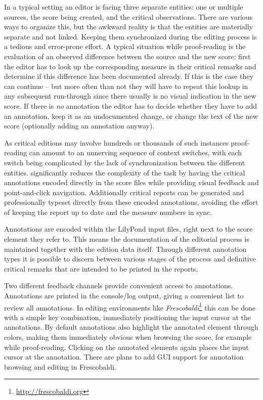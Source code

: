 \documentclass[]{ollmanual}
\begin{document}
In a typical setting an editor is facing three separate entities: one or
multiple sources, the score being created, and the critical
observations. There are various ways to organize this, but the awkward
reality is that the entities are materially separate and not linked.
Keeping them synchronized during the editing process is a tedious and
error-prone effort. A typical situation while proof-reading is the
evaluation of an observed difference between the source and the new
score: first the editor has to look up the corresponding measure in
their critical remarks and determine if this difference has been
documented already. If this is the case they can continue -- but more
often than not they will have to repeat this lookup in any subsequent
run-through since there usually is no visual indication in the new
score. If there is \emph{no} annotation the editor has to decide whether
they have to add an annotation, keep it as an undocumented change, or
change the text of the new score (optionally adding an annotation
anyway).

As critical editions may involve hundreds or thousands of such instances
proof-reading can amount to an unnerving sequence of context switches,
with each switch being complicated by the lack of synchronization
between the different entities. 
significantly reduces the complexity of the task by having the critical
annotations encoded directly in the score files while providing visual
feedback and point-and-click navigation. Additionally critical reports
can be generated and professionally typeset directly from these encoded
annotations, avoiding the effort of keeping the report up to date and
the measure numbers in sync.

Annotations are encoded within the LilyPond input files, right next to
the score element they refer to. This means the documentation of the
editorial process is maintained together with the edition data itself.
Through different annotation types it is possible to discern between
various stages of the process and definitive critical remarks that are
intended to be printed in the reports.

Two different feedback channels provide convenient access to
annotations. Annotations are printed in the console/log output, giving a
convenient list to review all annotations. In editing environments like
\emph{Frescobaldi}\footnote{\url{http://frescobaldi.org}} this can be
done with a simple key combination, immediately positioning the input
cursor at the annotations. By default annotations also highlight the
annotated element through colors, making them immediately obvious when
browsing the score, for example while proof-reading. Clicking on the
annotated elements again places the input cursor at the annotation.
There are plans to add GUI support for annotation browsing and editing
in Frescobaldi.
\end{document}
